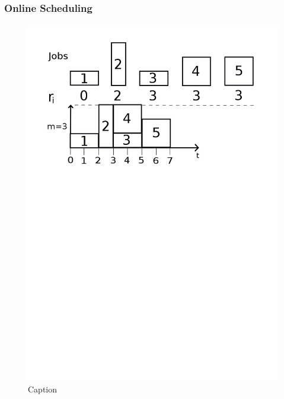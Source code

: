 \documentclass{beamer}
\begin{document}
\begin{frame}
  \frametitle{Online Scheduling}
  \begin{figure}[H]
          \centering
          \includegraphics[width=\textwidth]{online2.png}
          \caption{Caption}
          \label{fig:online2_png}
  \end{figure}

\end{frame}
\end{document}
